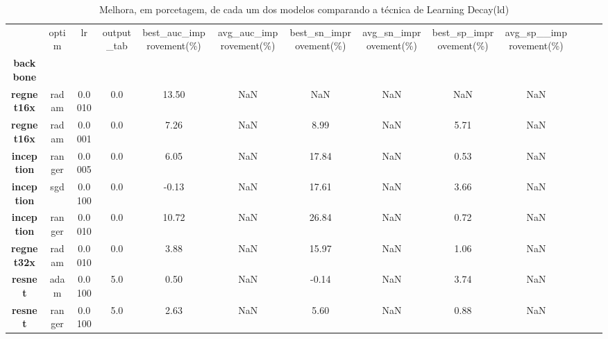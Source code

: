 \begin{table}
\centering
\caption{Melhora, em porcetagem, de cada um dos modelos comparando a técnica de Learning Decay(ld)}
\label{tab:results_improvement}
\begin{tabular}{c|c|c|c|c|c|c|c|c|c|c|c|c|}
\toprule
{} &   optim &      lr &  output\_tab &  best\_auc\_improvement(\%) &  avg\_auc\_improvement(\%) &  best\_sn\_improvement(\%) &  avg\_sn\_improvement(\%) &  best\_sp\_improvement(\%) &  avg\_sp\_\_improvement(\%) \\
\textbf{backbone } &         &         &             &                          &                         &                         &                        &                         &                         \\
\midrule
\textbf{regnet16x} &   radam &  0.0010 &         0.0 &                    13.50 &                     NaN &                     NaN &                    NaN &                     NaN &                     NaN \\
\textbf{regnet16x} &   radam &  0.0001 &         0.0 &                     7.26 &                     NaN &                    8.99 &                    NaN &                    5.71 &                     NaN \\
\textbf{inception} &  ranger &  0.0005 &         0.0 &                     6.05 &                     NaN &                   17.84 &                    NaN &                    0.53 &                     NaN \\
\textbf{inception} &     sgd &  0.0100 &         0.0 &                    -0.13 &                     NaN &                   17.61 &                    NaN &                    3.66 &                     NaN \\
\textbf{inception} &  ranger &  0.0010 &         0.0 &                    10.72 &                     NaN &                   26.84 &                    NaN &                    0.72 &                     NaN \\
\textbf{regnet32x} &   radam &  0.0010 &         0.0 &                     3.88 &                     NaN &                   15.97 &                    NaN &                    1.06 &                     NaN \\
\textbf{resnet   } &    adam &  0.0100 &         5.0 &                     0.50 &                     NaN &                   -0.14 &                    NaN &                    3.74 &                     NaN \\
\textbf{resnet   } &  ranger &  0.0100 &         5.0 &                     2.63 &                     NaN &                    5.60 &                    NaN &                    0.88 &                     NaN \\

\end{tabular}
\end{table}
